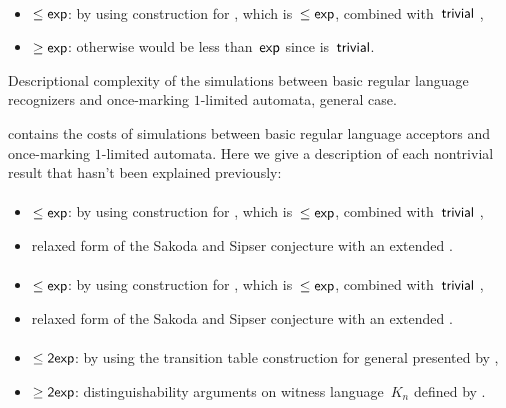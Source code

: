 \paragraph{\ODLA{}\tto\TDFA}
\begin{itemize}
	\item $\le\mathsf{exp}$: by using construction for \hyperref[cost:1DLAto1DFA]{\ODLA{}\tto\ODFA}, which is~$\le\mathsf{exp}$, combined with~$\mathsf{trivial}$ \ODFA{}\tto\TDFA,
	\item $\ge\mathsf{exp}$: otherwise \hyperref[cost:1DLAto2NFA]{\ODLA{}\tto\TNFA} would be less than~$\mathsf{exp}$ since \TDFA{}\tto\TNFA is~$\mathsf{trivial}$.
\end{itemize}


\begin{table}
	\centering
	\caption{Descriptional complexity of the simulations between basic regular language recognizers and once-marking $1$-limited automata, general case.}
	\label{tab:sims-om-general}
\end{table}

 contains the costs of simulations between basic regular language acceptors and once-marking $1$-limited automata.
Here we give a description of each nontrivial result that hasn't been explained previously:

\paragraph{\ONFA{}\tto\OMODLA}
\begin{itemize}
	\item $\le\mathsf{exp}$: by using construction for \hyperref[cost:1NFAto1DFA]{\ONFA{}\tto\ODFA}, which is~$\le\mathsf{exp}$, combined with~$\mathsf{trivial}$ \ODFA{}\tto\OMODLA,
	\item relaxed form of the Sakoda and Sipser conjecture with an extended \TDFA.
\end{itemize}
\paragraph{\TNFA{}\tto\OMODLA}
\begin{itemize}
	\item $\le\mathsf{exp}$: by using construction for \hyperref[cost:2NFAto1DFA]{\TNFA{}\tto\ODFA}, which is~$\le\mathsf{exp}$, combined with~$\mathsf{trivial}$ \ODFA{}\tto\OMODLA,
	\item relaxed form of the Sakoda and Sipser conjecture with an extended \TDFA.
\end{itemize}
\paragraph{\OMOLA{}\tto\ODFA}\label{cost:OM1LAto1DFA}
\begin{itemize}
	\item $\le\mathsf{2exp}$: by using the transition table construction for general \OLAs presented by ,
	\item $\ge\mathsf{2exp}$: distinguishability arguments on witness language~$K_n$ defined by .
\end{itemize}
